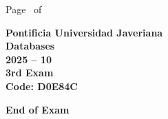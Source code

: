 \documentclass[11pt, addpoints, answers]{exam}\usepackage[utf8]{inputenc}
\begin{document}
\begin{coverpages}
\begin{center}
			\vspace{3mm}
			\leavevmode \hspace{5mm} 
		\end{center}
	\end{coverpages}

	\footer{} {Page \thepage\ of \numpages} {}

	\centering
	\textbf{\Large Pontificia Universidad Javeriana}\\
	\textbf{\Large Databases} \\
	\textbf{\large 2025 -- 10} \\
	\textbf{\large 3rd Exam} \\
	\textbf{Code: D0E84C}


	\begin{questions}
		
		
		
		
		
		
		
		
		
		
		
		
		
		
		
		
		
		
		
		
	\end{questions}

	\vspace{5mm}
	\noindent \textbf{End of Exam}
\end{document}
